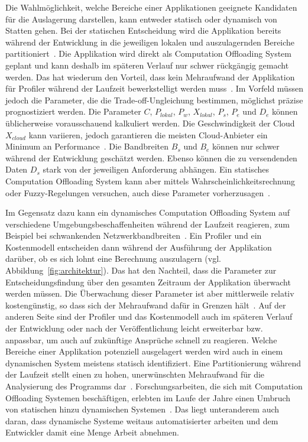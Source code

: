 \documentclass{sigchi}
\begin{document}
Die Wahlmöglichkeit, welche Bereiche einer Applikationen geeignete Kandidaten für die Auslagerung darstellen, kann entweder statisch oder dynamisch von Statten gehen.
Bei der statischen Entscheidung wird die Applikation bereits während der Entwicklung in die jeweiligen lokalen und auszulagernden Bereiche partitioniert~\cite{o4}.
Die Applikation wird direkt als Computation Offloading System geplant und kann deshalb im späteren Verlauf nur schwer rückgängig gemacht werden.
Das hat wiederum den Vorteil, dass kein Mehraufwand der Applikation für Profiler während der Laufzeit bewerkstelligt werden muss~\cite{o4}.
Im Vorfeld müssen jedoch die Parameter, die die Trade-off-Ungleichung bestimmen, möglichst präzise prognostiziert werden.
Die Parameter $C$, $P_{\textit{lokal}}$, $P_w$, $X_{\textit{lokal}}$, $P_s$, $P_e$ und $D_e$ können üblicherweise vorausschauend kalkuliert werden.
 Die Geschwindigkeit der Cloud $X_{\textit{cloud}}$ kann variieren, jedoch garantieren die meisten Cloud-Anbieter ein Minimum an Performance~\cite{o4}.
 Die Bandbreiten $B_s$ und $B_e$ können nur schwer während der Entwicklung geschätzt werden.
 Ebenso können die zu versendenden Daten $D_s$ stark von der jeweiligen Anforderung abhängen.
 Ein statisches Computation Offloading System kann aber mittels Wahrscheinlichkeitsrechnung oder Fuzzy-Regelungen versuchen, auch diese Parameter vorherzusagen~\cite{o4}.

Im Gegensatz dazu kann ein dynamisches Computation Offloading System auf verschiedene Umgebungsbeschaffenheiten während der Laufzeit reagieren, zum Beispiel bei schwankenden Netzwerkbandbreiten~\cite{o4}.
Ein Profiler und ein Kostenmodell entscheiden dann während der Ausführung der Applikation darüber, ob es sich lohnt eine Berechnung auszulagern (vgl. Abbildung~\ref{fig:architektur}).
Das hat den Nachteil, dass die Parameter zur Entscheidungsfindung über den gesamten Zeitraum der Applikation überwacht werden müssen.
Die Überwachung dieser Parameter ist aber mittlerweile relativ kostengünstig, so dass sich der Mehraufwand dafür in Grenzen hält~\cite{thinkair}.
Auf der anderen Seite sind der Profiler und das Kostenmodell auch im späteren Verlauf der Entwicklung oder nach der Veröffentlichung leicht erweiterbar bzw. anpassbar, um auch auf zukünftige Ansprüche schnell zu reagieren.
Welche Bereiche einer Applikation potenziell ausgelagert werden wird auch in einem dynamischen System meistens statisch identifiziert.
Eine Partitionierung während der Laufzeit stellt einen zu hohen, unerwünschten Mehraufwand für die Analysierung des Programms dar~\cite{o4}.
Forschungsarbeiten, die sich mit Computation Offloading Systemen beschäftigen, erlebten im Laufe der Jahre einen Umbruch von statischen hinzu dynamischen Systemen~\cite{o4}.
Das liegt unteranderem auch daran, dass dynamische Systeme weitaus automatisierter arbeiten und dem Entwickler damit eine Menge Arbeit abnehmen.
\end{document}
